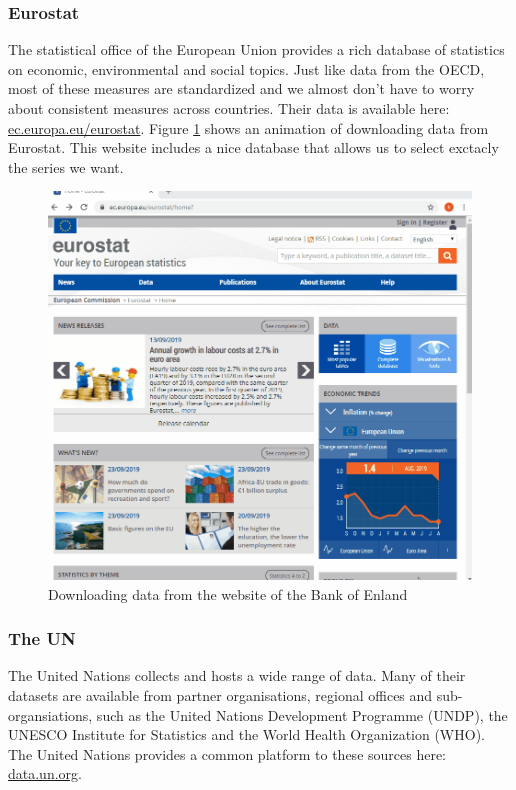 \documentclass[]{book}
\begin{document}
\hypertarget{eurostat}{%
\subsubsection{Eurostat}\label{eurostat}}

The statistical office of the European Union provides a rich database of statistics on economic, environmental and social topics. Just like data from the OECD, most of these measures are standardized and we almost don't have to worry about consistent measures across countries. Their data is available here: \href{https://ec.europa.eu/eurostat/web/main/home}{ec.europa.eu/eurostat}. Figure \ref{fig:source6} shows an animation of downloading data from Eurostat. This website includes a nice database that allows us to select exctacly the series we want.

\begin{figure}

{\centering \includegraphics[width=0.6\linewidth]{_resources/chapter_sources/eurostat} 

}

\caption{Downloading data from the website of the Bank of Enland}\label{fig:source6}
\end{figure}

\hypertarget{the-un}{%
\subsubsection{The UN}\label{the-un}}

The United Nations collects and hosts a wide range of data. Many of their datasets are available from partner organisations, regional offices and sub-organsiations, such as the United Nations Development Programme (UNDP), the UNESCO Institute for Statistics and the World Health Organization (WHO). The United Nations provides a common platform to these sources here: \href{http://data.un.org/Default.aspx}{data.un.org}.
\end{document}
